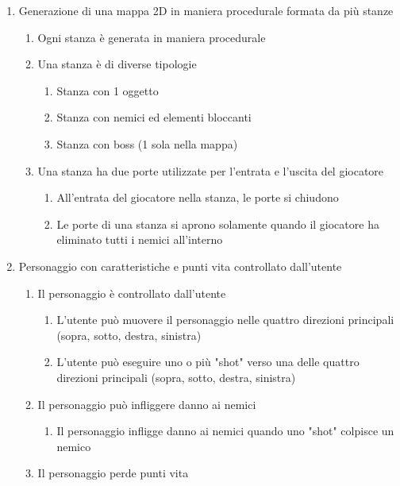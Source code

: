 \begin{enumerate}
    \item Generazione di una mappa 2D in maniera procedurale formata da più stanze
    \begin{enumerate}
        \item Ogni stanza è generata in maniera procedurale
        \item Una stanza è di diverse tipologie
        \begin{enumerate}
            \item Stanza con 1 oggetto
            \item Stanza con nemici ed elementi bloccanti
            \item Stanza con boss (1 sola nella mappa)
        \end{enumerate}
            \item Una stanza ha due porte utilizzate per l'entrata e l'uscita del giocatore
            \begin{enumerate}
            \item All'entrata del giocatore nella stanza, le porte si chiudono
            \item Le porte di una stanza si aprono solamente quando il giocatore ha eliminato tutti i nemici all'interno
        \end{enumerate}
    \end{enumerate}
    \item Personaggio con caratteristiche e punti vita controllato dall'utente
    \begin{enumerate}
        \item Il personaggio è controllato dall'utente
        \begin{enumerate}
            \item L'utente può muovere il personaggio nelle quattro direzioni principali (sopra, sotto, destra, sinistra)
            \item L'utente può eseguire uno o più "shot" verso una delle quattro direzioni principali (sopra, sotto, destra, sinistra)
        \end{enumerate}
        \item Il personaggio può infliggere danno ai nemici
        \begin{enumerate}
            \item Il personaggio infligge danno ai nemici quando uno "shot" colpisce un nemico
        \end{enumerate}
        \item Il personaggio perde punti vita

\end{enumerate}
\end{enumerate}

